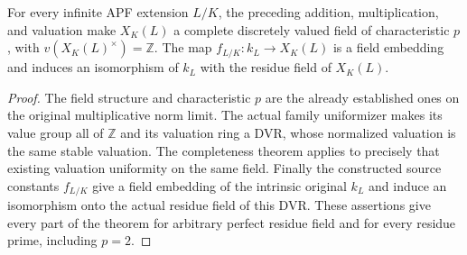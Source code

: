\begin{theorem}
\label{fw:field-norms}
\leanok
For every infinite APF extension $L/K$, the preceding addition,
multiplication, and valuation make $X_K(L)$ a complete discretely valued
field of characteristic $p$, with $v(X_K(L)^\times)=\mathbb Z$.
The map $f_{L/K}:k_L\longrightarrow X_K(L)$ is a field embedding and
induces an isomorphism of $k_L$ with the residue field of $X_K(L)$.
\end{theorem}
\begin{proof}
The field structure and characteristic $p$ are the already established
ones on the original multiplicative norm limit. The actual family
uniformizer makes its value group all of $\mathbb Z$ and its valuation
ring a DVR, whose normalized valuation is the same stable valuation.
The completeness theorem applies to precisely that existing valuation
uniformity on the same field. Finally the constructed source constants
$f_{L/K}$ give a field embedding of the intrinsic original $k_L$ and
induce an isomorphism onto the actual residue field of this DVR.
These assertions give every part of the theorem for arbitrary perfect
residue field and for every residue prime, including $p=2$.
\end{proof}

